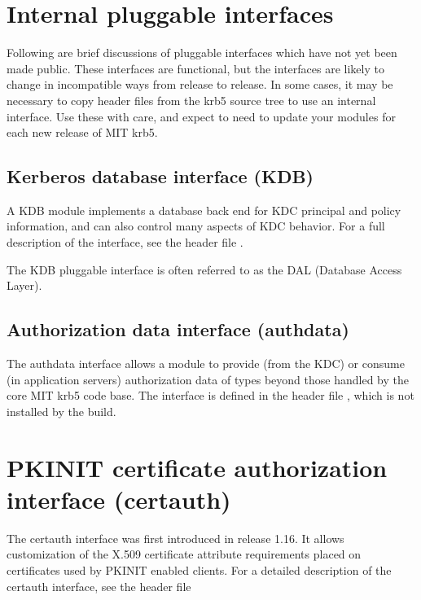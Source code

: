 \documentclass[letterpaper,10pt,english]{sphinxmanual}
\begin{document}
\section{Internal pluggable interfaces}
\label{\detokenize{plugindev/internal::doc}}\label{\detokenize{plugindev/internal:internal-pluggable-interfaces}}
Following are brief discussions of pluggable interfaces which have not
yet been made public.  These interfaces are functional, but the
interfaces are likely to change in incompatible ways from release to
release.  In some cases, it may be necessary to copy header files from
the krb5 source tree to use an internal interface.  Use these with
care, and expect to need to update your modules for each new release
of MIT krb5.


\subsection{Kerberos database interface (KDB)}
\label{\detokenize{plugindev/internal:kerberos-database-interface-kdb}}
A KDB module implements a database back end for KDC principal and
policy information, and can also control many aspects of KDC behavior.
For a full description of the interface, see the header file
.

The KDB pluggable interface is often referred to as the DAL (Database
Access Layer).


\subsection{Authorization data interface (authdata)}
\label{\detokenize{plugindev/internal:authorization-data-interface-authdata}}
The authdata interface allows a module to provide (from the KDC) or
consume (in application servers) authorization data of types beyond
those handled by the core MIT krb5 code base.  The interface is
defined in the header file , which is not
installed by the build.


\section{PKINIT certificate authorization interface (certauth)}
\label{\detokenize{plugindev/certauth:certauth-plugin}}\label{\detokenize{plugindev/certauth::doc}}\label{\detokenize{plugindev/certauth:pkinit-certificate-authorization-interface-certauth}}
The certauth interface was first introduced in release 1.16.  It
allows customization of the X.509 certificate attribute requirements
placed on certificates used by PKINIT enabled clients.  For a detailed
description of the certauth interface, see the header file
\end{document}
